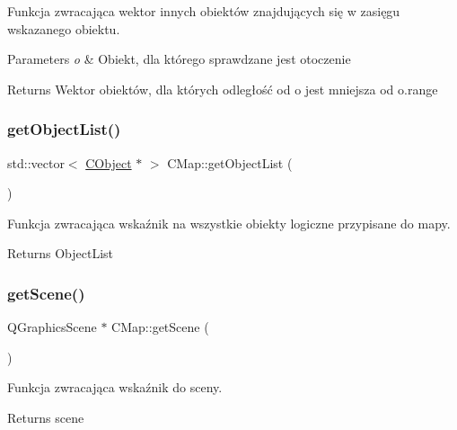 Funkcja zwracająca wektor innych obiektów znajdujących się w zasięgu wskazanego obiektu. 


\begin{DoxyParams}{Parameters}
{\em o} & Obiekt, dla którego sprawdzane jest otoczenie \\
\hline
\end{DoxyParams}
\begin{DoxyReturn}{Returns}
Wektor obiektów, dla których odległość od o jest mniejsza od o.\+range 
\end{DoxyReturn}
\mbox{\label{class_c_map_ae6b5f2e5ca9db035092b730ad92a4aaf}} 
\subsubsection{\texorpdfstring{get\+Object\+List()}{getObjectList()}}
{\footnotesize\ttfamily std\+::vector$<$ \mbox{\hyperlink{class_c_object}{C\+Object}} $\ast$ $>$ C\+Map\+::get\+Object\+List (\begin{DoxyParamCaption}{ }\end{DoxyParamCaption})}



Funkcja zwracająca wskaźnik na wszystkie obiekty logiczne przypisane do mapy. 

\begin{DoxyReturn}{Returns}
Object\+List 
\end{DoxyReturn}
\mbox{\label{class_c_map_ac2282caabd7d3830bd1c731177883e50}} 
\subsubsection{\texorpdfstring{get\+Scene()}{getScene()}}
{\footnotesize\ttfamily Q\+Graphics\+Scene $\ast$ C\+Map\+::get\+Scene (\begin{DoxyParamCaption}{ }\end{DoxyParamCaption})}



Funkcja zwracająca wskaźnik do sceny. 

\begin{DoxyReturn}{Returns}
scene 
\end{DoxyReturn}
\mbox{\label{class_c_map_a194d39490529731472920eac44df1548}} 
